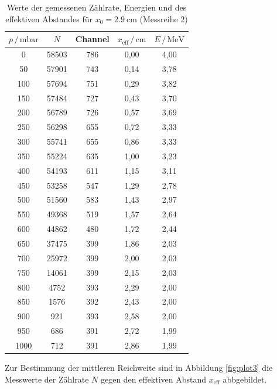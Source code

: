   \begin{table}
    \centering
    \caption{Werte der gemessenen Zählrate, Energien und des effektiven Abstandes für 
              $x_0 = \SI{2.9}{\centi\meter}$ (Messreihe 2)}
    \label{tab:mess2}
    \begin{tabular}{c c c c c}
    \toprule
    $p \,/\, \si{\milli\bar}$ & $N$ & Channel & $x_\text{eff} \,/\, \si{\centi\meter}$ & 
    $E \,/\, \si{\mega\eV}$\\
    \midrule 
         0 & 58503 & 786 & 0,00 & 4,00 \\
        50 & 57901 & 743 & 0,14 & 3,78 \\
       100 & 57694 & 751 & 0,29 & 3,82 \\
       150 & 57484 & 727 & 0,43 & 3,70 \\
       200 & 56789 & 726 & 0,57 & 3,69 \\
       250 & 56298 & 655 & 0,72 & 3,33 \\
       300 & 55741 & 655 & 0,86 & 3,33 \\
       350 & 55224 & 635 & 1,00 & 3,23 \\
       400 & 54193 & 611 & 1,15 & 3,11 \\
       450 & 53258 & 547 & 1,29 & 2,78 \\
       500 & 51560 & 583 & 1,43 & 2,97 \\
       550 & 49368 & 519 & 1,57 & 2,64 \\
       600 & 44862 & 480 & 1,72 & 2,44 \\
       650 & 37475 & 399 & 1,86 & 2,03 \\
       700 & 25972 & 399 & 2,00 & 2,03 \\
       750 & 14061 & 399 & 2,15 & 2,03 \\
       800 &  4752 & 393 & 2,29 & 2,00 \\
       850 &  1576 & 392 & 2,43 & 2,00 \\
       900 &   921 & 393 & 2,58 & 2,00 \\
       950 &   686 & 391 & 2,72 & 1,99 \\
      1000 &   712 & 391 & 2,86 & 1,99 \\
    \bottomrule
    \end{tabular}
    \end{table}

    Zur Bestimmung der mittleren Reichweite sind in Abbildung \ref{fig:plot3} die Messwerte der Zählrate $N$ 
    gegen den effektiven Abstand $x_\text{eff}$ abbgebildet.
    
